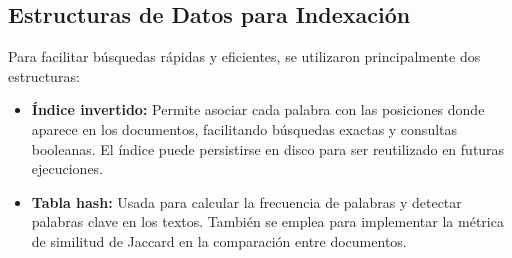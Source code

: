 \documentclass[9pt,letterpaper,onecolumn]{rho-class/rho}
\begin{document}


\subsection{Estructuras de Datos para Indexación}

Para facilitar búsquedas rápidas y eficientes, se utilizaron principalmente dos estructuras:

\begin{itemize}
    \item \textbf{Índice invertido:}  
    Permite asociar cada palabra con las posiciones donde aparece en los documentos, facilitando búsquedas exactas y consultas booleanas. El índice puede persistirse en disco para ser reutilizado en futuras ejecuciones.

    \item \textbf{Tabla hash:}  
    Usada para calcular la frecuencia de palabras y detectar palabras clave en los textos. También se emplea para implementar la métrica de similitud de Jaccard en la comparación entre documentos.
\end{itemize}

\end{document}
